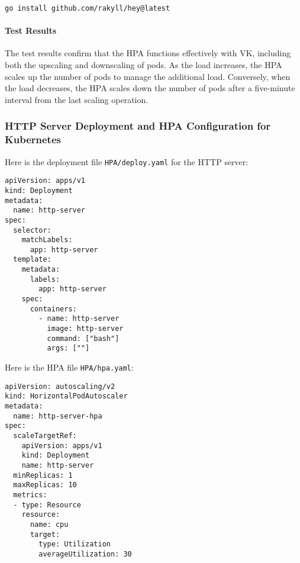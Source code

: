 \begin{verbatim}
go install github.com/rakyll/hey@latest
\end{verbatim}

\paragraph{Test Results}

The test results confirm that the HPA functions effectively with VK, including both the upscaling and downscaling of pods. As the load increases, the HPA scales up the number of pods to manage the additional load. Conversely, when the load decreases, the HPA scales down the number of pods after a five-minute interval from the last scaling operation.

\subsubsection{HTTP Server Deployment and HPA Configuration for Kubernetes}

Here is the deployment file \texttt{HPA/deploy.yaml} for the HTTP server:

\begin{verbatim}
apiVersion: apps/v1
kind: Deployment
metadata:
  name: http-server
spec:
  selector:
    matchLabels:
      app: http-server
  template:
    metadata:
      labels:
        app: http-server
    spec:
      containers:
        - name: http-server
          image: http-server
          command: ["bash"]
          args: [""]
\end{verbatim}

Here is the HPA file \texttt{HPA/hpa.yaml}:

\begin{verbatim}
apiVersion: autoscaling/v2
kind: HorizontalPodAutoscaler
metadata:
  name: http-server-hpa
spec:
  scaleTargetRef:
    apiVersion: apps/v1
    kind: Deployment
    name: http-server
  minReplicas: 1
  maxReplicas: 10
  metrics:
  - type: Resource
    resource:
      name: cpu
      target:
        type: Utilization
        averageUtilization: 30
\end{verbatim}
